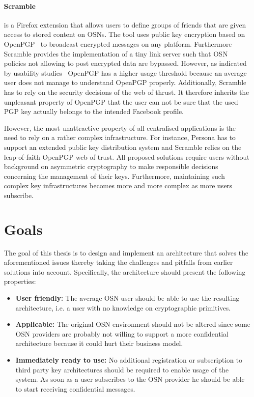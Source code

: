 \paragraph{Scramble~\cite{art:BeatoKW11}} is a Firefox extension that allows users to define groups of friends that are given access to stored content on OSNs. The tool uses public key encryption based on OpenPGP~\cite{rfc4880} to broadcast encrypted messages on any platform. Furthermore Scramble provides the implementation of a tiny link server such that OSN policies not allowing to post encrypted data are bypassed. However, as indicated by usability studies~\cite{art:WhittenT99} OpenPGP has a higher usage threshold because an average user does not manage to understand OpenPGP properly. Additionally, Scramble has to rely on the security decisions of the web of thrust. It therefore inherits the unpleasant property of OpenPGP that the user can not be sure that the used PGP key actually belongs to the intended Facebook profile.

However, the most unattractive property of all centralised applications is the need to rely on a rather complex infrastructure. For instance, Persona has to support an extended public key distribution system and Scramble relies on the leap-of-faith OpenPGP web of trust. All proposed solutions require users without background on asymmetric cryptography to make responsible decisions concerning the management of their keys. Furthermore, maintaining such complex key infrastructures becomes more and more complex as more users subscribe.

\section{Goals}
\label{sec:goals_of_this_thesis}
The goal of this thesis is to design and implement an architecture that solves the aforementioned issues thereby taking the challenges and pitfalls from earlier solutions into account. Specifically, the architecture should present the following properties:
\begin{itemize}
 \item \textbf{User friendly:} The average OSN user should be able to use the resulting architecture, i.e. a user with no knowledge on cryptographic primitives.
 \item \textbf{Applicable:} The original OSN environment should not be altered since some OSN providers are probably not willing to support a more confidential architecture because it could hurt their business model.
 \item \textbf{Immediately ready to use:} No additional registration or subscription to third party key architectures should be required to enable usage of the system. As soon as a user subscribes to the OSN provider he should be able to start receiving confidential messages.
\end{itemize}

